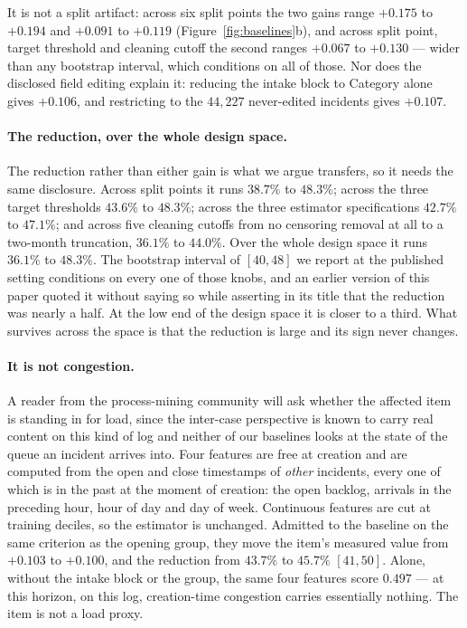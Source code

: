 \documentclass[preprint,12pt]{elsarticle}
\begin{document}
It is not a split artifact: across six split points the two gains range
$+0.175$ to $+0.194$ and $+0.091$ to $+0.119$ (Figure~\ref{fig:baselines}b),
and across split point, target threshold and cleaning cutoff the second
ranges $+0.067$ to $+0.130$ --- wider than any bootstrap interval, which
conditions on all of those. Nor does the disclosed field editing explain it:
reducing the intake block to Category alone gives $+0.106$, and restricting
to the $44{,}227$ never-edited incidents gives $+0.107$.

\paragraph{The reduction, over the whole design space.}
The reduction rather than either gain is what we argue transfers, so it needs
the same disclosure. Across split points it runs $38.7\%$ to $48.3\%$; across
the three target thresholds $43.6\%$ to $48.3\%$; across the three estimator
specifications $42.7\%$ to $47.1\%$; and across five cleaning cutoffs from no
censoring removal at all to a two-month truncation, $36.1\%$ to $44.0\%$.
Over the whole design space it runs $\mathbf{36.1\%}$ to $\mathbf{48.3\%}$.
The bootstrap interval of $[40,48]$ we report at the published setting
conditions on every one of those knobs, and an earlier version of this paper
quoted it without saying so while asserting in its title that the reduction
was nearly a half. At the low end of the design space it is closer to a
third. What survives across the space is that the reduction is large and its
sign never changes.

\paragraph{It is not congestion.}
A reader from the process-mining community will ask whether the affected item
is standing in for load, since the inter-case perspective is known to carry
real content on this kind of log \citep{senderovich2017intercase} and neither
of our baselines looks at the state of the queue an incident arrives into.
Four features are free at creation and are computed from the open and close
timestamps of \emph{other} incidents, every one of which is in the past at the
moment of creation: the open backlog, arrivals in the preceding hour, hour of
day and day of week. Continuous features are cut at training deciles, so the
estimator is unchanged. Admitted to the baseline on the same criterion as the
opening group, they move the item's measured value from $+0.103$ to $+0.100$,
and the reduction from $43.7\%$ to $45.7\%$ $[41,50]$. Alone, without the
intake block or the group, the same four features score $0.497$ --- at this
horizon, on this log, creation-time congestion carries essentially nothing.
The item is not a load proxy.
\end{document}
